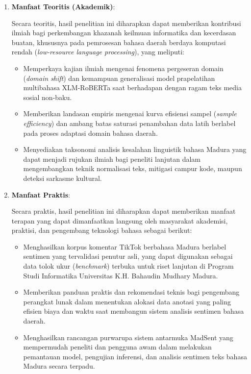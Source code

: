 \begin{enumerate}
    \item \textbf{Manfaat Teoritis (Akademik)}:
    
    Secara teoritis, hasil penelitian ini diharapkan dapat memberikan kontribusi ilmiah bagi perkembangan khazanah keilmuan informatika dan kecerdasan buatan, khususnya pada pemrosesan bahasa daerah berdaya komputasi rendah (\textit{low-resource language processing}), yang meliputi:
    \begin{itemize}
        \item Memperkaya kajian ilmiah mengenai fenomena pergeseran domain (\textit{domain shift}) dan kemampuan generalisasi model prapelatihan multibahasa XLM-RoBERTa saat berhadapan dengan ragam teks media sosial non-baku.
        \item Memberikan landasan empiris mengenai kurva efisiensi sampel (\textit{sample efficiency}) dan ambang batas saturasi penambahan data latih berlabel pada proses adaptasi domain bahasa daerah.
        \item Menyediakan taksonomi analisis kesalahan linguistik bahasa Madura yang dapat menjadi rujukan ilmiah bagi peneliti lanjutan dalam mengembangkan teknik normalisasi teks, mitigasi campur kode, maupun deteksi sarkasme kultural.
    \end{itemize}
    
    \item \textbf{Manfaat Praktis}:
    
    Secara praktis, hasil penelitian ini diharapkan dapat memberikan manfaat terapan yang dapat dimanfaatkan langsung oleh masyarakat akademisi, praktisi, dan pengembang teknologi bahasa sebagai berikut:
    \begin{itemize}
        \item Menghasilkan korpus komentar TikTok berbahasa Madura berlabel sentimen yang tervalidasi penutur asli, yang dapat digunakan sebagai data tolok ukur (\textit{benchmark}) terbuka untuk riset lanjutan di Program Studi Informatika Universitas K.H. Bahaudin Mudhary Madura.
        \item Memberikan panduan praktis dan rekomendasi teknis bagi pengembang perangkat lunak dalam menentukan alokasi data anotasi yang paling efisien biaya dan waktu saat membangun sistem analisis sentimen bahasa daerah.
        \item Menghasilkan rancangan purwarupa sistem antarmuka MadSent yang mempermudah peneliti dan pengguna awam dalam melakukan pemantauan model, pengujian inferensi, dan analisis sentimen teks bahasa Madura secara terpadu.
    \end{itemize}
\end{enumerate}
